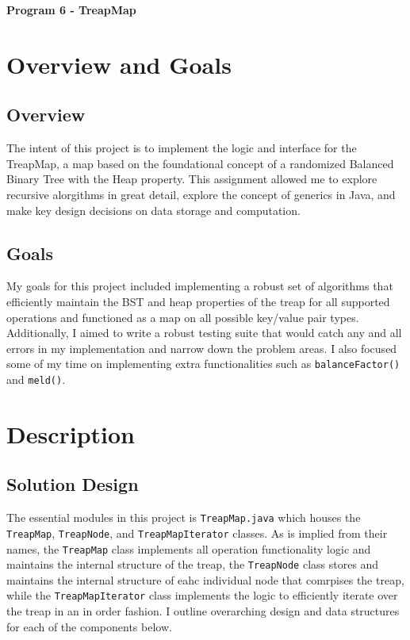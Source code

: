 \documentclass[11pt]{article}
\def\tt{\texttt}
\def\TM{\tt{TreapMap}}
\begin{document}
\begin{center}
    \huge\textbf{Program 6 - TreapMap}
\end{center}

\section{Overview and Goals}
\subsection{Overview}
The intent of this project is to implement the logic and interface for the TreapMap, a map based on the foundational concept of a randomized Balanced Binary Tree with the Heap property. This assignment allowed me to explore recursive alorgithms in great detail, explore the concept of generics in Java, and make key design decisions on data storage and computation. 
\subsection*{Goals}
My goals for this project included implementing a robust set of algorithms that efficiently maintain the BST and heap properties of the treap for all supported operations and functioned as a map on all possible key/value pair types. Additionally, I aimed to write a robust testing suite that would catch any and all errors in my implementation and narrow down the problem areas. I also focused some of my time on implementing extra functionalities such as \tt{balanceFactor()} and \tt{meld()}.
\section{Description}
\subsection{Solution Design}
The essential modules in this project is \tt{\TM.java} which houses the \tt{\TM{}}, \tt{TreapNode}, and \tt{TreapMapIterator} classes. As is implied from their names, the \TM{} class implements all operation functionality logic and maintains the internal structure of the treap, the \tt{TreapNode} class stores and maintains the internal structure of eahc individual node that comrpises the treap, while the \tt{TreapMapIterator}
class implements the logic to efficiently iterate over the treap in an in order fashion. I  outline overarching design and data structures for each of the components below.
\end{document}
